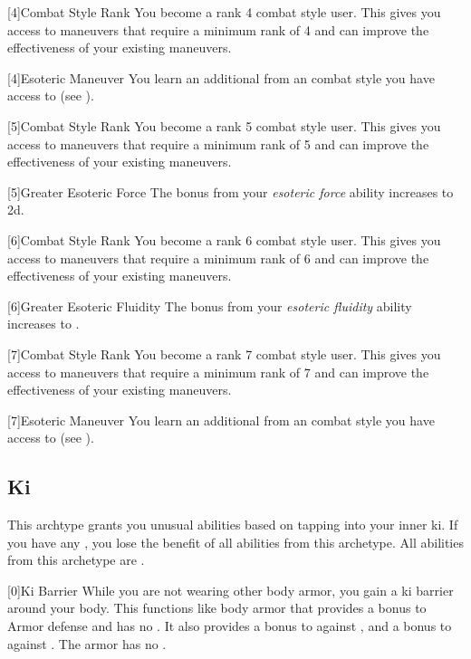         {
            [4]{Combat Style Rank} You become a rank 4 combat style user.
            This gives you access to maneuvers that require a minimum rank of 4 and can improve the effectiveness of your existing maneuvers.

            [4]{Esoteric Maneuver}
            You learn an additional  from an combat style you have access to (see ).
        }

        {
            [5]{Combat Style Rank} You become a rank 5 combat style user.
            This gives you access to maneuvers that require a minimum rank of 5 and can improve the effectiveness of your existing maneuvers.

            [5]{Greater Esoteric Force} The bonus from your \textit{esoteric force} ability increases to \plus2d.
        }

        {
            [6]{Combat Style Rank} You become a rank 6 combat style user.
            This gives you access to maneuvers that require a minimum rank of 6 and can improve the effectiveness of your existing maneuvers.

            [6]{Greater Esoteric Fluidity} The bonus from your \textit{esoteric fluidity} ability increases to .
        }

        {
            [7]{Combat Style Rank} You become a rank 7 combat style user.
            This gives you access to maneuvers that require a minimum rank of 7 and can improve the effectiveness of your existing maneuvers.

            [7]{Esoteric Maneuver}
            You learn an additional  from an combat style you have access to (see ).
        }

    \newpage
    \subsection{Ki}
        This archtype grants you unusual abilities based on tapping into your inner ki.
        If you have any , you lose the benefit of all abilities from this archetype.
        All abilities from this archetype are .

        [0]{Ki Barrier}
        While you are not wearing other body armor, you gain a ki barrier around your body.
        This functions like body armor that provides a  bonus to Armor defense and has no .
        It also provides a  bonus to  against , and a  bonus to  against .
        The armor has no .

